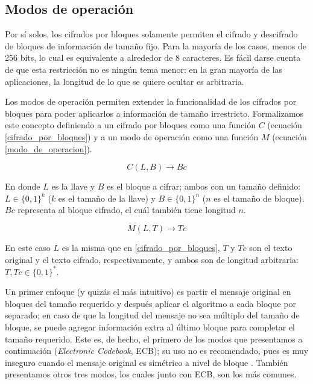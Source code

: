 %
%

\subsection{Modos de operación}

Por sí solos, los cifrados por bloques solamente permiten el cifrado y
descifrado de bloques de información de tamaño fijo. Para la mayoría de los
casos, menos de 256 bits\cite{modos_de_operacion}, lo cual es equivalente a
alrededor de 8 caracteres. Es fácil darse cuenta de que esta restricción no
es ningún tema menor: en la gran mayoría de las aplicaciones, la longitud de
lo que se quiere ocultar es arbitraria.

Los modos de operación permiten extender la funcionalidad de los cifrados por
bloques para poder aplicarlos a información de tamaño irrestricto. Formalizamos
este concepto definiendo a un cifrado por bloques como una función $ C $
(ecuación \ref{cifrado_por_bloques}) y a un modo de operación como una función
$ M $ (ecuación \ref{modo_de_operacion}).

\begin{equation}
  \label{cifrado_por_bloques}
  C(L, B) \rightarrow Bc
\end{equation}

En donde $ L $ es la llave y $ B $ es el bloque a cifrar; ambos con un tamaño
definido: $ L \in \{0, 1\}^k $ ($ k $ es el tamaño de la llave) y
$ B \in \{0, 1\}^n $ ($ n $ es el tamaño de bloque). $ Bc $ representa al
bloque cifrado, el cuál también tiene longitud $ n $.

\begin{equation}
  \label{modo_de_operacion}
  M(L, T) \rightarrow Tc
\end{equation}

En este caso $ L $ es la misma que en \ref{cifrado_por_bloques}, $ T $ y
$ Tc $ son el texto original y el texto cifrado, respectivamente, y ambos
son de longitud arbitraria: $ T, Tc \in \{0, 1\}^* $.

Un primer enfoque (y quizás el más intuitivo) es partir el mensaje original
en bloques del tamaño requerido y después aplicar el algoritmo a cada bloque
por separado; en caso de que la longitud del mensaje no sea múltiplo del
tamaño de bloque, se puede agregar información extra al último bloque para
completar el tamaño requerido. Este es, de hecho, el primero de los modos que
presentamos a continuación (\textit{Electronic Codebook}, ECB); su uso no es
recomendado, pues es muy inseguro cuando el mensaje original es simétrico a
nivel de bloque \cite{modos_de_operacion}. También presentamos otros tres
modos, los cuales junto con ECB, son los más comunes.







